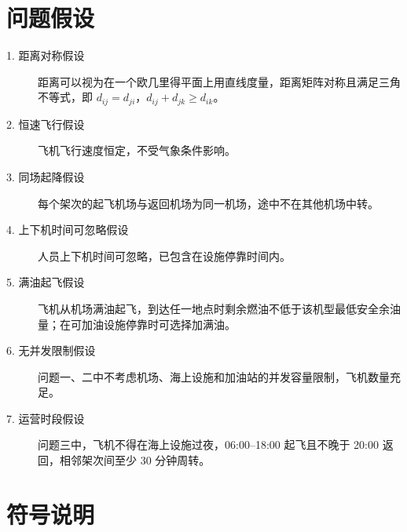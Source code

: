 \documentclass[withoutpreface]{cumcmthesis}
\begin{document}
\section{问题假设}

\begin{description}
\item[1. 距离对称假设] 距离可以视为在一个欧几里得平面上用直线度量，距离矩阵对称且满足三角不等式，即 $d_{ij} = d_{ji}$，$d_{ij} + d_{jk} \geq d_{ik}$。

\item[2. 恒速飞行假设] 飞机飞行速度恒定，不受气象条件影响。

\item[3. 同场起降假设] 每个架次的起飞机场与返回机场为同一机场，途中不在其他机场中转。

\item[4. 上下机时间可忽略假设] 人员上下机时间可忽略，已包含在设施停靠时间内。

\item[5. 满油起飞假设] 飞机从机场满油起飞，到达任一地点时剩余燃油不低于该机型最低安全余油量；在可加油设施停靠时可选择加满油。

\item[6. 无并发限制假设] 问题一、二中不考虑机场、海上设施和加油站的并发容量限制，飞机数量充足。

\item[7. 运营时段假设] 问题三中，飞机不得在海上设施过夜，06:00--18:00 起飞且不晚于 20:00 返回，相邻架次间至少 30 分钟周转。
\end{description}

\section{符号说明}
\end{document}
